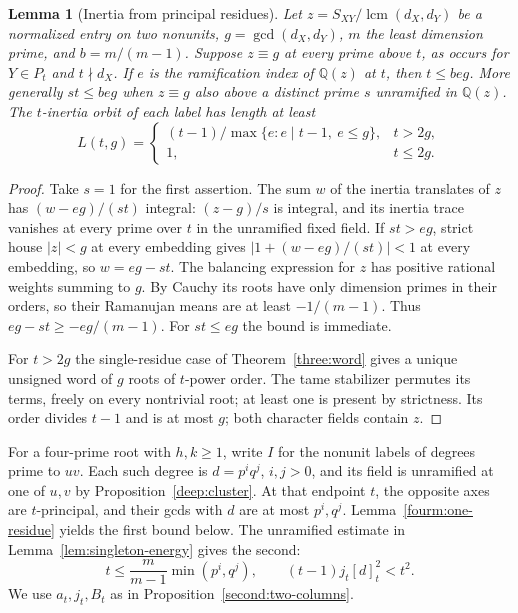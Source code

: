 \documentclass[11pt,a4paper]{article}
\numberwithin{equation}{section}
\newtheorem{lemma}[theorem]{Lemma}
\theoremstyle{remark}
\begin{document}
\begin{lemma}[Inertia from principal residues]\label{fam:M:8.5}\label{fourm:one-residue}
Let $z=S_{XY}/\operatorname{lcm}(d_X,d_Y)$ be a normalized entry on
two nonunits, $g=\gcd(d_X,d_Y)$, $m$ the least dimension prime, and
$b=m/(m-1)$. Suppose $z\equiv g$ at every prime above $t$, as occurs
for $Y\in P_t$ and $t\nmid d_X$. If $e$ is the ramification index of $\mathbb Q(z)$ at $t$, then $t\le beg$.
More generally $st\le beg$ when $z\equiv g$ also above a distinct
prime $s$ unramified in $\mathbb Q(z)$.
The $t$-inertia orbit of each label has length at least
\[
 L(t,g)=\begin{cases}(t-1)/\max\{e:e\mid t-1,\ e\le g\},&t>2g,\\ 1,&t\le2g.\end{cases}
\]
\end{lemma}
\begin{proof}
Take $s=1$ for the first assertion. The sum $w$ of the inertia
translates of $z$ has $(w-eg)/(st)$ integral: $(z-g)/s$ is integral,
and its inertia trace vanishes at every prime over $t$ in the
unramified fixed field. If $st>eg$, strict house $|z|<g$ at every
embedding gives $|1+(w-eg)/(st)|<1$ at every embedding, so $w=eg-st$.
The balancing expression for $z$ has positive rational weights summing
to $g$. By Cauchy its roots have only dimension primes in their orders,
so their Ramanujan means are at least $-1/(m-1)$.
Thus $eg-st\ge-eg/(m-1)$. For $st\le eg$ the bound is immediate.

For $t>2g$ the single-residue case of Theorem~\ref{three:word}
gives a unique unsigned word of $g$ roots of $t$-power order.
The tame stabilizer permutes its terms, freely on every nontrivial
root; at least one is present by strictness. Its order divides $t-1$ and is at most $g$; both character fields contain $z$.
\end{proof}

For a four-prime root with $h,k\ge1$, write $I$ for the nonunit
labels of degrees prime to $uv$. Each such degree is $d=p^iq^j$,
$i,j>0$, and its field is unramified at one of $u,v$ by
Proposition~\ref{deep:cluster}. At that endpoint $t$, the opposite
axes are $t$-principal, and their gcds with $d$ are at most
$p^i,q^j$. Lemma~\ref{fourm:one-residue} yields the first bound below.
The unramified estimate in Lemma~\ref{lem:singleton-energy}
gives the second:
\begin{equation}\label{eq:firstestimate}
 t\le\frac{m}{m-1}\min(p^i,q^j),\qquad
 (t-1)j_t[d]_t^2<t^2 .
\end{equation}
We use $a_t,j_t,B_t$ as in Proposition~\ref{second:two-columns}.
\end{document}
